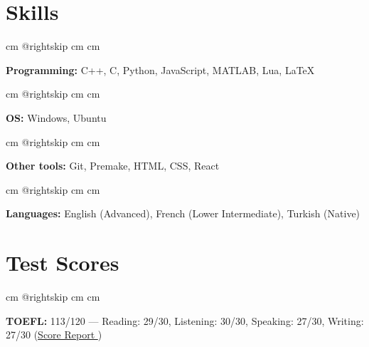 \documentclass[10pt, a4paper]{article}
\let\hrefWithoutArrow\href
\renewcommand{\href}[2]{\hrefWithoutArrow{#1}{#2 \raisebox{.15ex}{\footnotesize \faExternalLink*}}}
\begin{document}
    \section{Skills}
    
            \begingroup\raggedright
             cm
            \advance\csname @rightskip cm
            \advance{} cm

            \textbf{Programming:} C++, C, Python, JavaScript, MATLAB, Lua, LaTeX

            \par\endgroup

        \vspace{0.12 cm}
            \begingroup\raggedright
             cm
            \advance\csname @rightskip cm
            \advance{} cm

            \textbf{OS:} Windows, Ubuntu

            \par\endgroup

        \vspace{0.12 cm}
            \begingroup\raggedright
             cm
            \advance\csname @rightskip cm
            \advance{} cm

            \textbf{Other tools:} Git, Premake, HTML, CSS, React

            \par\endgroup

        \vspace{0.12 cm}
            \begingroup\raggedright
             cm
            \advance\csname @rightskip cm
            \advance{} cm

            \textbf{Languages:} English (Advanced), French (Lower Intermediate), Turkish (Native)

            \par\endgroup



    \section{Test Scores}
    
            \begingroup\raggedright
             cm
            \advance\csname @rightskip cm
            \advance{} cm

            \textbf{TOEFL:} 113/120 — Reading: 29/30, Listening: 30/30, Speaking: 27/30, Writing: 27/30 (\href{https://example.com/}{Score Report})
\end{document}
